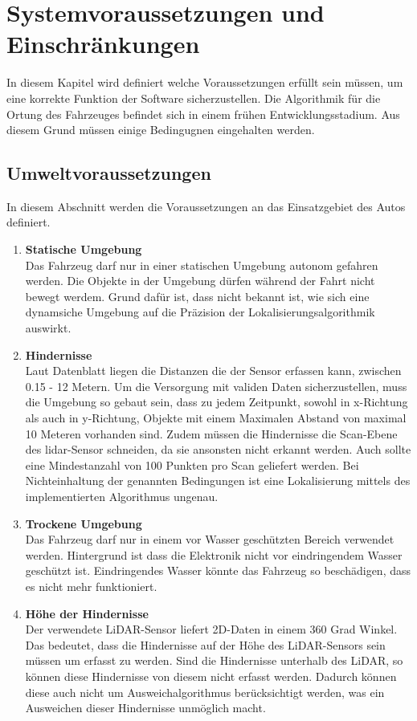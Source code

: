 \section{Systemvoraussetzungen und Ein\-schränkungen}
In diesem Kapitel wird definiert welche Voraussetzungen erfüllt sein müssen, um eine korrekte Funktion der Software sicherzustellen.
Die Algorithmik für die Ortung des Fahrzeuges befindet sich in einem frühen Entwicklungsstadium. 
Aus diesem Grund müssen einige Bedingugnen eingehalten werden. 

\subsection{Umweltvoraussetzungen}
In diesem Abschnitt werden die Voraussetzungen an das Einsatzgebiet des Autos definiert.

\begin{enumerate}[leftmargin=*]
    \item \textbf{Statische Umgebung} \\
    Das Fahrzeug darf nur in einer statischen Umgebung autonom gefahren werden. 
    Die Objekte in der Umgebung dürfen während der Fahrt nicht bewegt werdem.
    Grund dafür ist, dass nicht bekannt ist, wie sich eine dynamsiche Umgebung auf die Präzision der Lokalisierungsalgorithmik auswirkt. 
    
    \item \textbf{Hindernisse} \\
    Laut Datenblatt \cite{Slamtec2020} liegen die Distanzen die der Sensor erfassen kann, zwischen 0.15 - 12 Metern.
    Um die Versorgung mit validen Daten sicherzustellen, muss die Umgebung so gebaut sein, 
    dass zu jedem Zeitpunkt, sowohl in x-Richtung als auch in y-Richtung, Objekte mit einem Maximalen Abstand von maximal 10 Meteren vorhanden sind.
    Zudem müssen die Hindernisse die Scan-Ebene des \ac{lidar}-Sensor schneiden, da sie ansonsten nicht erkannt werden.
    Auch sollte eine Mindestanzahl von 100 Punkten pro Scan geliefert werden.
    Bei Nichteinhaltung der genannten Bedingungen ist eine Lokalisierung mittels des implementierten Algorithmus ungenau.
    
    \item \textbf{Trockene Umgebung} \\
    Das Fahrzeug darf nur in einem vor Wasser geschützten Bereich verwendet werden.
    Hintergrund ist dass die Elektronik nicht vor eindringendem Wasser geschützt ist.
    Eindringendes Wasser könnte das Fahrzeug so beschädigen, dass es nicht mehr funktioniert.
   
    \item \textbf{Höhe der Hindernisse} \\
    Der verwendete LiDAR-Sensor liefert 2D-Daten in einem 360 Grad Winkel. 
    Das bedeutet, dass die Hindernisse auf der Höhe des LiDAR-Sensors sein müssen um erfasst zu werden.
    Sind die Hindernisse unterhalb des LiDAR, so können diese Hindernisse von diesem nicht erfasst werden.
    Dadurch können diese auch nicht um Ausweichalgorithmus berücksichtigt werden, was ein Ausweichen dieser Hindernisse unmöglich macht.
\end{enumerate}

